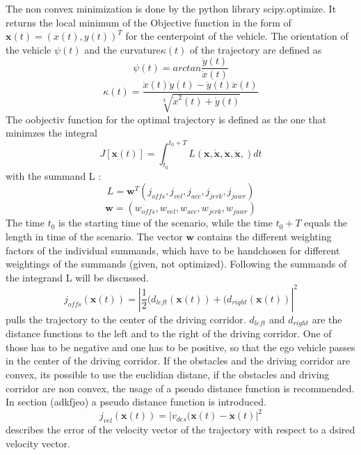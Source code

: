 \documentclass[conference]{IEEEtran}
\begin{document}
The non convex minimization is done by the python library scipy.optimize. It returns the local minimum of the Objective function in the form of $\mathbf{x}(t) = (x(t), y(t))^T$ for the centerpoint of the vehicle. The orientation of the vehicle $\psi (t) $ and the curvature$\kappa(t)$  of the trajectory are defined as
\begin{equation}
\psi (t) = arctan\frac{\dot{y}(t)}{\dot{x}(t)}
\end{equation}
\begin{equation}
\kappa (t) = \frac{\dot{x}(t) \ddot{y}(t) -\dot{y}(t) \ddot{x}(t) }{\sqrt[3]{\dot{x}^2(t)+\dot{y}(t)}}
\end{equation}
The oobjectiv function for the optimal trajectory is defined as the one that minimzes the integral
\begin{equation}
J\left[\mathbf{x}(t)\right]   = \int_{t_0}^{t_0 + T} L(\mathbf{x},\mathbf{\dot{x}},\mathbf{\ddot{x}},\mathbf{\dddot{x}},) dt
\end{equation}
with the summand L :
\begin{equation}
L  = \mathbf{w}^T(j_{offs}, j_{vel}, j_{acc}, j_{jerk}, j_{jawr})
\end{equation}
\begin{equation}
\mathbf{w} = (w_{offs} , w_{vel} ,w_{acc} ,w_{jerk} ,w_{jawr})
\end{equation}
The time $t_0$ is the starting time of the scenario, while the time $t_0 +T$ equals the length in time of the scenario. The vector $\mathbf{w}$ contains the different weighting factors of the individual summands, which have to be handchosen for different weightings of the summands (given, not optimized).
Following the summands of the integrand L will be discussed.
$$ j_{offs}(\mathbf{x}(t)) = \left|\frac{1}{2}(d_{left}(\mathbf{x}(t))+ (d_{right}(\mathbf{x}(t))\right|^2 $$
pulls the trajectory to the center of the driving corridor. $d_{left}$ and $d_{right}$ are the distance functions to the left and to the right of the driving corridor. One of those has to be negative and one has to be positive, so that the ego vehicle passes in the center of the driving corridor. If the  obstacles and the driving corridor are convex, its possible to use the euclidian distane, if the obstacles and driving corridor are non convex, the usage of a pseudo distance function is recommended. In section (adkfjeo) a pseudo distance function is introduced.
$$ j_{vel}(\mathbf{x}(t)) = \left| v_{des}(\mathbf{x}(t) - \mathbf{\dot{x}}(t) \right|^2 $$
describes the error of the velocity vector of the trajectory with respect to a dsired velocity vector.
\end{document}
